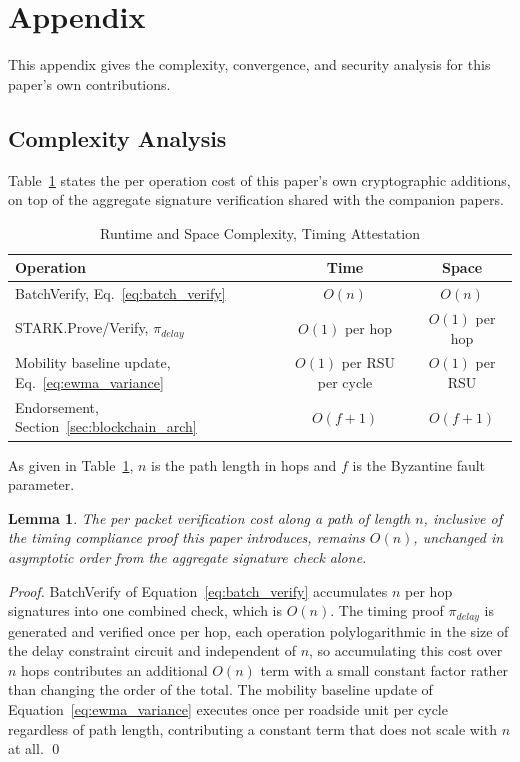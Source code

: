 \documentclass[final,5p,twocolumn]{elsarticle}
\newtheorem{lemma}{Lemma}
\theoremstyle{remark}
\theoremstyle{plain}
\begin{document}
\section[\appendixname~\thesection]{Appendix}
\label{appendix}

This appendix gives the complexity, convergence, and security analysis for
this paper's own contributions.


\subsection{Complexity Analysis}
\label{app:complexity}

Table~\ref{tab:phantom_complexity} states the per operation cost of this
paper's own cryptographic additions, on top of the aggregate signature
verification shared with the companion papers.
\begin{table}[!t]
	\centering
	\caption{Runtime and Space Complexity, Timing Attestation}
	\label{tab:phantom_complexity}
	\renewcommand{\arraystretch}{1.2}
	\footnotesize
	\begin{tabular}{|l|c|c|}
		\hline
		\textbf{Operation} & \textbf{Time} & \textbf{Space} \\
		\hline
		BatchVerify, Eq.~\eqref{eq:batch_verify} & $O(n)$ & $O(n)$ \\
		\hline
		STARK.Prove/Verify, $\pi_{delay}$ & $O(1)$ per hop & $O(1)$ per hop \\
		\hline
		Mobility baseline update, Eq.~\eqref{eq:ewma_variance} & $O(1)$ per RSU per cycle & $O(1)$ per RSU \\
		\hline
		Endorsement, Section~\ref{sec:blockchain_arch} & $O(f{+}1)$ & $O(f{+}1)$ \\
		\hline
	\end{tabular}
\end{table}
As given in Table~\ref{tab:phantom_complexity}, $n$ is the path length in
hops and $f$ is the Byzantine fault parameter.

\begin{lemma}
	\label{lem:phantom_complexity}
	The per packet verification cost along a path of length $n$, inclusive
	of the timing compliance proof this paper introduces, remains $O(n)$,
	unchanged in asymptotic order from the aggregate signature check alone.
\end{lemma}
\begin{proof}
	BatchVerify of Equation~\eqref{eq:batch_verify} accumulates $n$ per hop
	signatures into one combined check, which is $O(n)$. The timing proof
	$\pi_{delay}$ is generated and verified once per hop, each operation
	polylogarithmic in the size of the delay constraint circuit and
	independent of $n$, so accumulating this cost over $n$ hops contributes
	an additional $O(n)$ term with a small constant factor rather than
	changing the order of the total. The mobility baseline update of
	Equation~\eqref{eq:ewma_variance} executes once per roadside unit per
	cycle regardless of path length, contributing a constant term that does
	not scale with $n$ at all.
	\qed
\end{proof}
\end{document}
